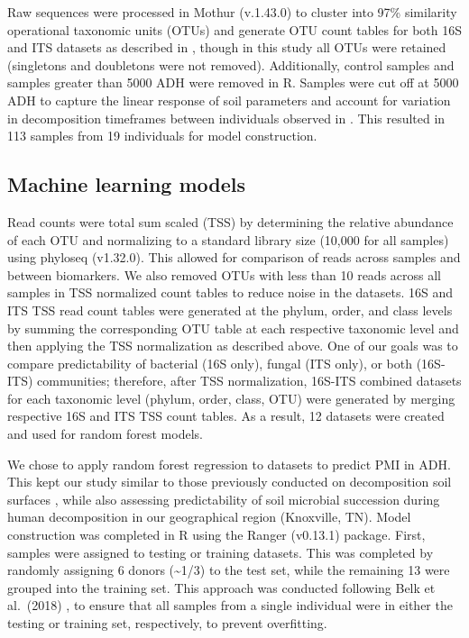 \documentclass[
  10pt,
  letterpaper,
]{article}
\begin{document}
Raw sequences were processed in Mothur \citep{schloss_introducing_2009}
(v.1.43.0) to cluster into 97\% similarity operational taxonomic units
(OTUs) and generate OTU count tables for both 16S and ITS datasets as
described in \citep{mason_body_2022}, though in this study all OTUs were
retained (singletons and doubletons were not removed). Additionally,
control samples and samples greater than 5000 ADH were removed in R.
Samples were cut off at 5000 ADH to capture the linear response of soil
parameters and account for variation in decomposition timeframes between
individuals observed in \citep{mason_body_2022}. This resulted in 113
samples from 19 individuals for model construction.

\hypertarget{machine-learning-models}{%
\subsection{Machine learning models}\label{machine-learning-models}}

Read counts were total sum scaled (TSS) by determining the relative
abundance of each OTU and normalizing to a standard library size (10,000
for all samples) using phyloseq \citep{mcmurdie_phyloseq_2013}
(v1.32.0). This allowed for comparison of reads across samples and
between biomarkers. We also removed OTUs with less than 10 reads across
all samples in TSS normalized count tables to reduce noise in the
datasets. 16S and ITS TSS read count tables were generated at the
phylum, order, and class levels by summing the corresponding OTU table
at each respective taxonomic level and then applying the TSS
normalization as described above. One of our goals was to compare
predictability of bacterial (16S only), fungal (ITS only), or both
(16S-ITS) communities; therefore, after TSS normalization, 16S-ITS
combined datasets for each taxonomic level (phylum, order, class, OTU)
were generated by merging respective 16S and ITS TSS count tables. As a
result, 12 datasets were created and used for random forest models.

We chose to apply random forest regression to datasets to predict PMI in
ADH. This kept our study similar to those previously conducted on
decomposition soil surfaces
\citep{belk_microbiome_2018, burcham_conserved_2024}, while also
assessing predictability of soil microbial succession during human
decomposition in our geographical region (Knoxville, TN). Model
construction was completed in R using the Ranger
\citep{wright_ranger_2017} (v0.13.1) package. First, samples were
assigned to testing or training datasets. This was completed by randomly
assigning 6 donors (\textasciitilde1/3) to the test set, while the
remaining 13 were grouped into the training set. This approach was
conducted following Belk et al.~(2018) \citep{belk_microbiome_2018}, to
ensure that all samples from a single individual were in either the
testing or training set, respectively, to prevent overfitting.
\end{document}
